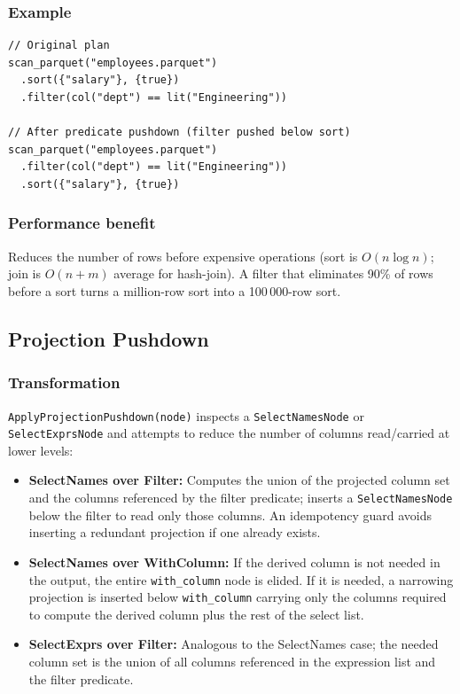 \documentclass[12pt,a4paper]{article}
\begin{document}
\subsubsection*{Example}

\begin{lstlisting}
// Original plan
scan_parquet("employees.parquet")
  .sort({"salary"}, {true})
  .filter(col("dept") == lit("Engineering"))

// After predicate pushdown (filter pushed below sort)
scan_parquet("employees.parquet")
  .filter(col("dept") == lit("Engineering"))
  .sort({"salary"}, {true})
\end{lstlisting}

\subsubsection*{Performance benefit}

Reduces the number of rows before expensive operations (sort is
$O(n \log n)$; join is $O(n + m)$ average for hash-join).  A filter that
eliminates 90\% of rows before a sort turns a million-row sort into a
100\,000-row sort.

\subsection{Projection Pushdown}

\subsubsection*{Transformation}

\texttt{ApplyProjectionPushdown(node)} inspects a \texttt{SelectNamesNode}
or \texttt{SelectExprsNode} and attempts to reduce the number of columns
read/carried at lower levels:

\begin{itemize}[leftmargin=1.5em]
  \item \textbf{SelectNames over Filter:} Computes the union of the
        projected column set and the columns referenced by the filter
        predicate; inserts a \texttt{SelectNamesNode} below the filter to
        read only those columns.  An idempotency guard avoids inserting a
        redundant projection if one already exists.

  \item \textbf{SelectNames over WithColumn:} If the derived column is not
        needed in the output, the entire \texttt{with\_column} node is
        elided.  If it is needed, a narrowing projection is inserted below
        \texttt{with\_column} carrying only the columns required to compute
        the derived column plus the rest of the select list.

  \item \textbf{SelectExprs over Filter:} Analogous to the SelectNames
        case; the needed column set is the union of all columns referenced
        in the expression list and the filter predicate.
\end{itemize}
\end{document}
